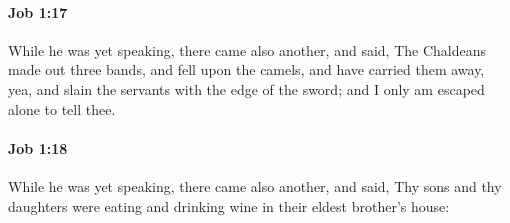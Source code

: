 		\paragraph{Job 1:17} %
			\label{JOB-1-17}

			While he was yet speaking, there came also another, and said, The Chaldeans made out three bands, and fell upon the camels, and have carried them away, yea, and slain the servants with the edge of the sword; and I only am escaped alone to tell thee.


		\paragraph{Job 1:18} %
			\label{JOB-1-18}

			While he was yet speaking, there came also another, and said, Thy sons and thy daughters were eating and drinking wine in their eldest brother’s house:

